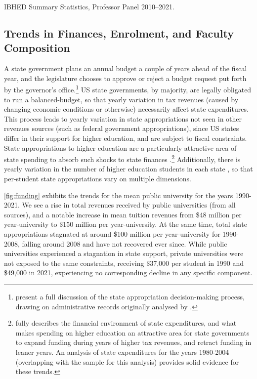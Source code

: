 \documentclass[notitlepage,12pt]{article}
\begin{document}
\begin{table}[h!]
    \singlespacing
    \centering
    \caption{IBHED Summary Statistics, Professor Panel 2010--2021.}
    \makebox[\textwidth][c]{}
    \label{tab:illinois-summary}
\end{table}

\subsection{Trends in Finances, Enrolment, and Faculty Composition}
\label{sec:trends}
A state government plans an annual budget a couple of years ahead of the fiscal year, and the legislature chooses to approve or reject a budget request put forth by the governor's office.\footnote{
    \cite{NBERw23736} present a full discussion of the state appropriation decision-making process, drawing on administrative records originally analysed by \cite{parmley2009state}.}
US state governments, by majority, are legally obligated to run a balanced-budget, so that yearly variation in tax revenues (caused by changing economic conditions or otherwise) necessarily affect state expenditures.
This process leads to yearly variation in state appropriations not seen in other revenues sources (such as federal government appropriations), since US states differ in their support for higher education, and are subject to fiscal constraints.
State appropriations to higher education are a particularly attractive area of state spending to absorb such shocks to state finances \citep{delaney2011state}.\footnote{
    \cite{delaney2011state} fully describes the financial environment of state expenditures, and what makes spending on higher education an attractive area for state governments to expand funding during years of higher tax revenues, and retract funding in leaner years.
    An analysis of state expenditures for the years 1980-2004 (overlapping with the sample for this analysis) provides solid evidence for these trends.
}
Additionally, there is yearly variation in the number of higher education students in each state \citep{turner2014impact}, so that per-student state appropriations vary on multiple dimensions.

\autoref{fig:funding} exhibits the trends for the mean public university for the years 1990-2021.
We see a rise in total revenues received by public universities (from all sources), and a notable increase in mean tuition revenues from \$48 million per year-university to \$150 million per year-university.
At the same time, total state appropriations stagnated at around \$100 million per year-university for 1990-2008, falling around 2008 and have not recovered ever since.
While public universities experienced a stagnation in state support, private universities were not exposed to the same constraints, receiving \$37,000 per student in 1990 and \$49,000 in 2021, experiencing no corresponding decline in any specific component.
\end{document}
